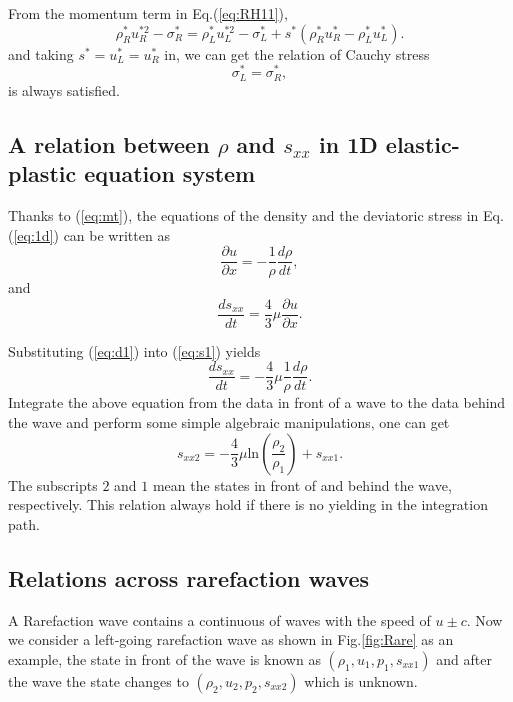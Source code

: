 \documentclass[review]{elsarticle}
\begin{document}
From the momentum term in Eq.(\ref{eq:RH11}),
\begin{equation}
  \rho_R^* u_R^{*2}-\sigma^*_R=\rho_L^* u_L^{*2}-\sigma_L^*+s^*(\rho_R^* u_R^*-\rho_L^* u_L^*).
\end{equation}
and taking  $ s^* = u_L^* = u_R^*$ in, we can get the relation of Cauchy stress
\begin{equation} 
  \sigma^*_L = \sigma^*_R,
\end{equation}
is always satisfied.

\subsection{A relation between $\rho$ and $s_{xx}$ in 1D elastic-plastic  equation system}

Thanks to (\ref{eq:mt}), the equations of the density and the deviatoric stress in Eq.(\ref{eq:1d}) can be written as
  \begin{equation}\label{eq:d1}
    \frac{\partial u}{\partial x} = -\frac{1}{\rho}\frac{d\rho}{dt},
  \end{equation}
  and
  \begin{equation}\label{eq:s1}
    \frac{ds_{xx}}{dt}=\frac{4}{3}\mu\frac{\partial u}{\partial x}.
  \end{equation}

  Substituting (\ref{eq:d1}) into (\ref{eq:s1}) yields
  \begin{equation}
    \frac{ds_{xx}}{dt}=-\frac{4}{3}\mu \frac{1}{\rho}\frac{d\rho}{dt}.
\end{equation}
Integrate the above equation from the data in front of a wave to the data behind the wave and perform some simple algebraic manipulations, one can get
\begin{equation}\label{eq:rhosxx}
  s_{xx2}=-\frac{4}{3}\mu\text{ln}(\frac{\rho_{2}}{\rho_{1}})+s_{xx1}.
\end{equation}
The subscripts $2$ and $1$ mean the states in front of and behind the wave, respectively.
This relation always hold if there is no yielding in the integration path.
\subsection{Relations across rarefaction waves}\label{sec:rarefaction}
A Rarefaction wave contains a continuous of waves with the speed of $u\pm c$. Now we consider a left-going rarefaction wave as shown in Fig.\ref{fig:Rare} as an example, the state in front of the wave is known as  $(\rho_1,u_1,p_1,s_{xx1})$ and after the wave the state changes to $(\rho_2,u_2,p_2,s_{xx2})$ which is unknown. 
\end{document}
